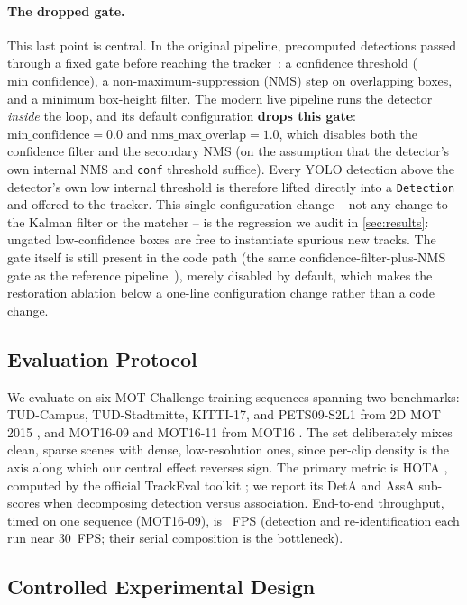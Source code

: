\paragraph{The dropped gate.}
This last point is central. In the original pipeline, precomputed detections passed through a fixed
gate before reaching the tracker~\cite{wojke2017deepsortcode}: a confidence threshold
($\text{min\_confidence}$), a non-maximum-suppression (NMS) step on overlapping boxes, and a minimum
box-height filter. The
modern live pipeline runs the detector \emph{inside} the loop, and its default configuration
\textbf{drops this gate}: $\text{min\_confidence}=0.0$ and $\text{nms\_max\_overlap}=1.0$, which
disables both the confidence filter and the secondary NMS (on the assumption that the detector's own
internal NMS and \texttt{conf} threshold suffice). Every YOLO detection above the detector's own
low internal threshold is therefore lifted directly into a \texttt{Detection} and offered to the
tracker. This single configuration change -- not any change to the Kalman filter or the matcher -- is
the regression we audit in \cref{sec:results}: ungated low-confidence boxes are free to instantiate
spurious new tracks. The gate itself is still present in the code path (the same confidence-filter-plus-NMS
gate as the reference pipeline~\cite{wojke2017deepsortcode}), merely disabled by default, which makes the
restoration ablation below a one-line configuration change rather than a code change.

\subsection{Evaluation Protocol}

We evaluate on six MOT-Challenge training sequences spanning two benchmarks: TUD-Campus,
TUD-Stadtmitte, KITTI-17, and PETS09-S2L1 from 2D MOT 2015 \cite{leal2015mot15}, and MOT16-09 and
MOT16-11 from MOT16 \cite{milan2016mot16}. The set deliberately mixes clean, sparse scenes with
dense, low-resolution ones, since per-clip density is the axis along which our central effect
reverses sign. The primary metric is HOTA \cite{luiten2021hota}, computed by the official TrackEval
toolkit \cite{luiten2020trackeval}; we report its DetA and AssA sub-scores when decomposing detection
versus association. End-to-end throughput, timed on one sequence (MOT16-09), is \fpsRealtime{}~FPS
(detection and re-identification each run near $30$~FPS; their serial composition is the bottleneck).

\subsection{Controlled Experimental Design}

